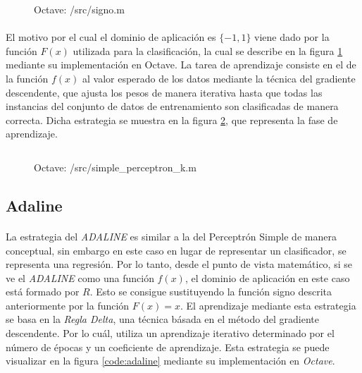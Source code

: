\documentclass{article}
\begin{document}
			\begin{figure}[h]
				\centering
				\inputminted{octave}{./code/signo.m}
				\caption{Octave: /src/signo.m}
				\label{code:signo}
			\end{figure}

			\paragraph{}
			El motivo por el cual el dominio de aplicación es $\{-1,1\}$ viene dado por la función $F(x)$ utilizada para la clasificación, la cual se describe en la figura \ref{code:signo} mediante su implementación en Octave. La tarea de aprendizaje consiste en el  de la función $f(x)$ al valor esperado de los datos mediante la técnica del gradiente descendente, que ajusta los pesos de manera iterativa hasta que todas las instancias del conjunto de datos de entrenamiento son clasificadas de manera correcta. Dicha estrategia se muestra en la figura \ref{code:simple_perceptron}, que representa la fase de aprendizaje.

			\begin{figure}[h]
				\centering
				\inputminted{octave}{./code/simple_perceptron_k.m}
				\caption{Octave: /src/simple\_perceptron\_k.m}
				\label{code:simple_perceptron}
			\end{figure}

		\subsection{Adaline}
		\label{sec:adaline}

			\paragraph{}
			La estrategia del \emph{ADALINE} es similar a la del Perceptrón Simple de manera conceptual, sin embargo en este caso en lugar de representar un clasificador, se representa una regresión. Por lo tanto, desde el punto de vista matemático, si se ve el \emph{ADALINE} como una función $f(x)$, el dominio de aplicación en este caso está formado por $R$. Esto se consigue sustituyendo la función signo descrita anteriormente por la función $F(x) = x$. El aprendizaje mediante esta estrategia se basa en la \emph{Regla Delta}, una técnica básada en el método del gradiente descendente. Por lo cuál, utiliza un aprendizaje iterativo determinado por el número de épocas y un coeficiente de aprendizaje. Esta estrategia se puede visualizar en la figura \ref{code:adaline} mediante su implementación en \emph{Octave}.
\end{document}
